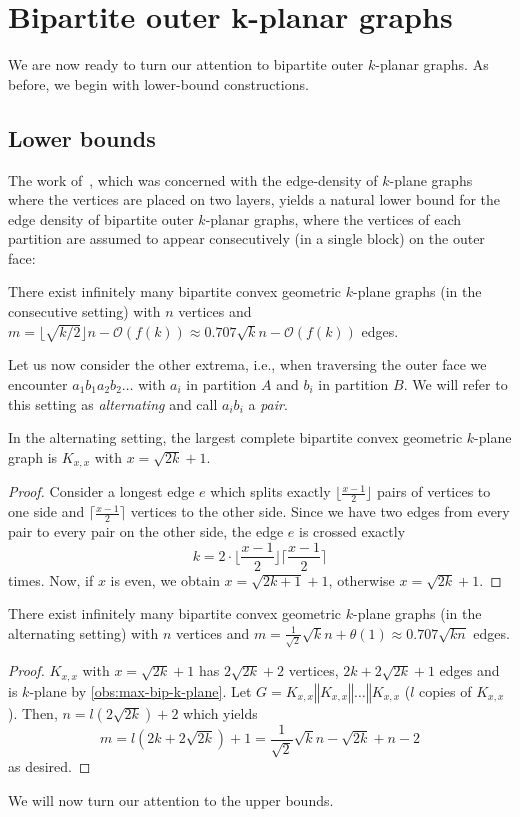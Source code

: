 \documentclass[nolineno,a4paper,USenglish,cleveref,autoref,thm-restate]
{socg}
\begin{document}
\section{Bipartite outer k-planar graphs}\label{sec:bipartite}
We are now ready to turn our attention to bipartite outer $k$-planar graphs.
As before, we begin with lower-bound constructions.

\subsection{Lower bounds}
The work of~\cite{TwoLayer}, which was concerned with the edge-density of $k$-plane graphs where the vertices are placed on two layers, yields a natural lower bound for the edge density of bipartite outer $k$-planar graphs, where the vertices of each partition are assumed to appear consecutively (in a single block) on the outer face:
\begin{theorem}
There exist infinitely many bipartite convex geometric $k$-plane graphs (in the consecutive setting) with $n$ vertices and $m = \lfloor \sqrt{k/2}\rfloor n - \mathcal{O}(f(k)) \approx 0.707\sqrt{k}n - \mathcal{O}(f(k))$ edges.    
\end{theorem}

Let us now consider the other extrema, i.e., when traversing the outer face we encounter $a_1b_1a_2b_2\dots$ with $a_i$ in partition $A$ and $b_i$ in partition $B$. We will refer to this setting as \emph{alternating} and call $a_ib_i$ a \emph{pair}.
\begin{observation}\label{obs:max-bip-k-plane}
    In the alternating setting, the largest complete bipartite convex geometric $k$-plane graph is $K_{x,x}$ with $x = \sqrt{2k}+1$.
\end{observation}
\begin{proof}
    Consider a longest edge $e$ which splits exactly $\lfloor\frac{x-1}{2}\rfloor$ pairs of vertices to one side and $\lceil\frac{x-1}{2}\rceil$ vertices to the other side. Since we have two edges from every pair to every pair on the other side, the edge $e$ is crossed exactly
    \[k = 2\cdot\lfloor\frac{x-1}{2}\rfloor\lceil\frac{x-1}{2}\rceil\] times.
    Now, if $x$ is even, we obtain $x = \sqrt{2k+1}+1$, otherwise $x = \sqrt{2k}+1$.
\end{proof}

\begin{theorem}\label{thm:lower-bip}
There exist infinitely many bipartite convex geometric $k$-plane graphs (in the alternating setting) with $n$ vertices and $m = \frac{1}{\sqrt{2}}\sqrt{k}n + \theta(1) \approx 0.707\sqrt{kn}$ edges.   
\end{theorem}
\begin{proof}
$K_{x,x}$ with $x = \sqrt{2k}+1$ has $2\sqrt{2k}+2$ vertices, $2k+2\sqrt{2k}+1$ edges
and is $k$-plane by \cref{obs:max-bip-k-plane}. Let $G = K_{x,x}  \mathbin\Vert K_{x,x} \mathbin\Vert \dots \mathbin\Vert K_{x,x}$ ($l$ copies of $K_{x,x}$). Then, $n =  l(2\sqrt{2k})+2$ which yields 
\[m =l(2k+2\sqrt{2k})+1 = \frac{1}{\sqrt{2}}\sqrt{k}n - \sqrt{2k}+n-2 \] as desired.
\end{proof}
We will now turn our attention to the upper bounds.
\end{document}
